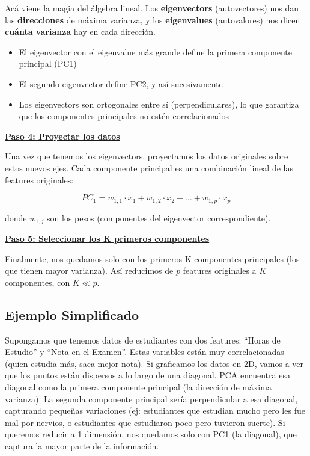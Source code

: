 \documentclass[12pt]{article}
\begin{document}
\vspace{0.5em}

Acá viene la magia del álgebra lineal. Los \textbf{eigenvectors} (autovectores) nos dan las \textbf{direcciones} de máxima varianza, y los \textbf{eigenvalues} (autovalores) nos dicen \textbf{cuánta varianza} hay en cada dirección.

\begin{itemize}
    \item El eigenvector con el eigenvalue más grande define la primera componente principal (PC1)
    \item El segundo eigenvector define PC2, y así sucesivamente
    \item Los eigenvectors son ortogonales entre sí (perpendiculares), lo que garantiza que los componentes principales no estén correlacionados
\end{itemize}

\textbf{\underline{Paso 4: Proyectar los datos}}

\vspace{0.5em}

Una vez que tenemos los eigenvectors, proyectamos los datos originales sobre estos nuevos ejes. Cada componente principal es una combinación lineal de las features originales:

\[
PC_1 = w_{1,1} \cdot x_1 + w_{1,2} \cdot x_2 + \ldots + w_{1,p} \cdot x_p
\]

donde $w_{1,j}$ son los pesos (componentes del eigenvector correspondiente).

\vspace{0.5em}

\textbf{\underline{Paso 5: Seleccionar los K primeros componentes}}

\vspace{0.5em}

Finalmente, nos quedamos solo con los primeros K componentes principales (los que tienen mayor varianza). Así reducimos de $p$ features originales a $K$ componentes, con $K \ll p$.

\subsection{Ejemplo Simplificado}

Supongamos que tenemos datos de estudiantes con dos features: ``Horas de Estudio'' y ``Nota en el Examen''. Estas variables están muy correlacionadas (quien estudia más, saca mejor nota). Si graficamos los datos en 2D, vamos a ver que los puntos están dispersos a lo largo de una diagonal. PCA encuentra esa diagonal como la primera componente principal (la dirección de máxima varianza). La segunda componente principal sería perpendicular a esa diagonal, capturando pequeñas variaciones (ej: estudiantes que estudian mucho pero les fue mal por nervios, o estudiantes que estudiaron poco pero tuvieron suerte). Si queremos reducir a 1 dimensión, nos quedamos solo con PC1 (la diagonal), que captura la mayor parte de la información.
\end{document}
